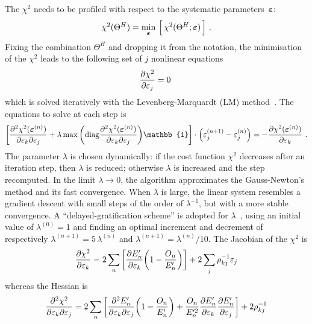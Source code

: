 \documentclass[a4paper, 11pt]{article}
\newcommand{\bs}{\boldsymbol}
\begin{document}
The $\chi^2$ needs to be profiled with respect to the systematic parameters~$\bs{\varepsilon}$:
\begin{equation}
	\label{eq:chi2_min}
	\chi^2(\Theta^H) = \min_{\bs{\varepsilon}}\, \qty\Big[\,\chi^2(\Theta^H;\bs{\varepsilon})\,]\ .
\end{equation}
Fixing the combination $\Theta^H$ and dropping it from the notation, %
the minimisation of the $\chi^2$ leads to the following set of $j$ nonlinear equations %
\begin{equation}
	\pdv{\chi^2}{\varepsilon_j} (\bs{\varepsilon}) = 0\ 
\end{equation}
which is solved iteratively with the Levenberg-Marquardt (LM) method~\cite{Levenberg_1944, Marquardt_1963}.
The equations to solve at each step is
\begin{equation}
	\qty[\pdv{\chi^2(\bs{\varepsilon}^{(n)})}{\varepsilon_k}{\varepsilon_j} %
	+ \lambda \max \qty(\text{diag} \pdv{\chi^2(\bs{\varepsilon}^{(n)})}{\varepsilon_k}{\varepsilon_j}) \mathbb{1}]
	\cdot \qty(\varepsilon_j^{(n+1)} - \varepsilon_j^{(n)}) = %
	-\pdv{\chi^2(\bs{\varepsilon}^{(n)})}{\varepsilon_k}\ .
\end{equation}
The parameter $\lambda$ is chosen dynamically: if the cost function $\chi^2$ decreases %
after an iteration step, then $\lambda$ is reduced; otherwise $\lambda$ is increased and the step recomputed.
In the limit $\lambda \to 0$, the algorithm approximates the Gauss-Newton's method and its fast convergence.
When $\lambda$ is large, the linear system resembles a gradient descent with small steps of the order of $\lambda^{-1}$, %
but with a more stable convergence.
A ``delayed-gratification scheme'' is adopted for $\lambda$~\cite{Transtrum2012}, using an initial value of $\lambda^{(0)} = 1$ and finding %
an optimal increment and decrement of respectively $\lambda^{(n+1)} = 5\,\lambda^{(n)}$ and $\lambda^{(n+1)} = \lambda^{(n)} / 10$.
The Jacobian of the $\chi^2$ is 
\begin{equation}
	\pdv{\chi^2}{\varepsilon_k} =
	2\sum_n \qty[\pdv{E_n'}{\varepsilon_k}\qty(1 - \frac{O_n}{E_n'})]
	+ 2\sum_j \rho^{-1}_{kj} \varepsilon_j
\end{equation}
whereas the Hessian is
\begin{equation}
	\pdv{\chi^2}{\varepsilon_k}{\varepsilon_j} =
	2\sum_n \qty[\pdv{E_n'}{\varepsilon_k}{\varepsilon_j} \qty(1 - \frac{O_n}{E_n'})
	+ \frac{O_n}{E_n'^2} \pdv{E_n'}{\varepsilon_k} \pdv{E_n'}{\varepsilon_j}]
	+ 2 \rho^{-1}_{kj}
\end{equation}
\end{document}

